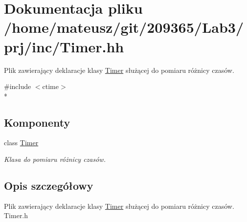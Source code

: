 \hypertarget{_timer_8hh}{\section{Dokumentacja pliku /home/mateusz/git/209365/\-Lab3/prj/inc/\-Timer.hh}
\label{_timer_8hh}
}


Plik zawierający deklaracje klasy \hyperlink{class_timer}{Timer} służącej do pomiaru różnicy czasów.  


{\ttfamily \#include $<$ctime$>$}\\*
\subsection*{Komponenty}
\begin{DoxyCompactItemize}
\item 
class \hyperlink{class_timer}{Timer}
\begin{DoxyCompactList}\small\item\em Klasa do pomiaru różnicy czasów. \end{DoxyCompactList}\end{DoxyCompactItemize}


\subsection{Opis szczegółowy}
Plik zawierający deklaracje klasy \hyperlink{class_timer}{Timer} służącej do pomiaru różnicy czasów. Timer.\-h 